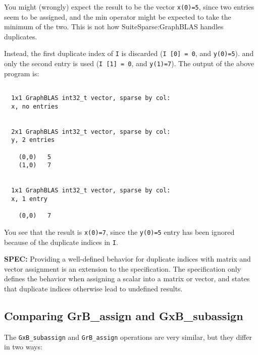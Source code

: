 \documentclass[12pt]{article}
\begin{document}
{You might (wrongly) expect the result to be the vector \verb'x(0)=5', since
two entries seem to be assigned, and the min operator might be expected to
take the minimum of the two.  This is not how SuiteSparse:GraphBLAS handles
duplicates.

Instead, the first duplicate index of \verb'I' is discarded
(\verb'I [0] = 0', and \verb'y(0)=5').
and only the second entry is used
(\verb'I [1] = 0', and \verb'y(1)=7').
The output of the above program is:

{\small
\begin{verbatim}

  1x1 GraphBLAS int32_t vector, sparse by col:
  x, no entries


  2x1 GraphBLAS int32_t vector, sparse by col:
  y, 2 entries

    (0,0)   5
    (1,0)   7


  1x1 GraphBLAS int32_t vector, sparse by col:
  x, 1 entry

    (0,0)   7

\end{verbatim}}

You see that the result is \verb'x(0)=7', since the \verb'y(0)=5' entry
has been ignored because of the duplicate indices in \verb'I'.

\begin{alert}
{\bf SPEC:} Providing a well-defined behavior for duplicate
indices with matrix and vector assignment is an extension to the specification.
The specification only defines the behavior when assigning a scalar into a matrix
or vector, and states that duplicate indices otherwise lead to undefined
results.
\end{alert}


\newpage
\subsection{Comparing {\sf GrB\_assign} and {\sf GxB\_subassign}} %
\label{compare_assign}

The \verb'GxB_subassign' and \verb'GrB_assign' operations are very similar, but
they differ in two ways:

}
\end{document}
